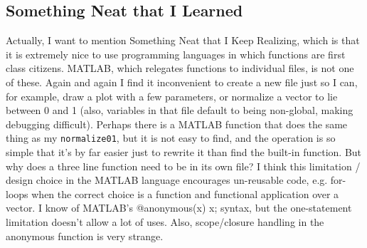 \documentclass[11pt]{report}
\begin{document}
\subsection{Something Neat that I Learned}

Actually, I want to mention Something Neat that I Keep Realizing, which is that it is extremely nice to use programming languages in which functions are first class citizens. MATLAB, which relegates functions to individual files, is not one of these. Again and again I find it inconvenient to create a new file just so I can, for example, draw a plot with a few parameters, or normalize a vector to lie between 0 and 1 (also, variables in that file default to being non-global, making debugging difficult). Perhaps there is a MATLAB function that does the same thing as my \texttt{normalize01}, but it is not easy to find, and the operation is so simple that it's by far easier just to rewrite it than find the built-in function. But why does a three line function need to be in its own file? I think this limitation / design choice in the MATLAB language encourages un-reusable code, e.g. for-loops when the correct choice is a function and functional application over a vector. I know of MATLAB's @anonymous(x) x; syntax, but the one-statement limitation doesn't allow a lot of uses. Also, scope/closure handling in the anonymous function is very strange.

\end{document}
